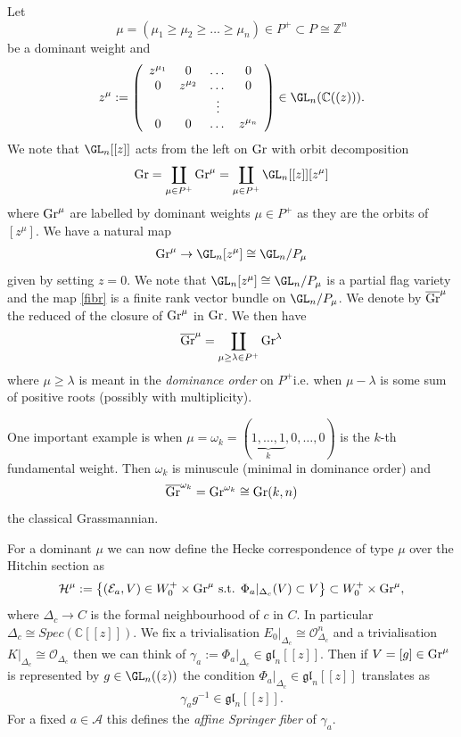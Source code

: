 \documentclass[12pt]{article}
\numberwithin{equation}{section}
\theoremstyle{remark}
\numberwithin{theorem}{section}
\def\beq{\begin{eqnarray}}
\def\eeq{\end{eqnarray}}
\def\calE{{\mathcal E}}
\def\C{\mathbb{C}}
\def\calA{{\mathcal{A}}}
\def\calH{\mathcal{H}}
\def\calO{{\mathcal O}}
\def\Z{\mathbb{Z}}
\def\gl{{\mathfrak g\mathfrak l}}
\newcommand{\Gr}{\textnormal{Gr}}
\newcommand{\oGr}{\overline{\textnormal{Gr}}}
\numberwithin{equation}{section}
\begin{document}
Let $$\mu=(\mu_1\geq \mu_2\geq\dots \geq \mu_n)\in P^+\subset P\cong\Z^n$$ be a dominant weight and $$z^\mu:=\left(\begin{array}{cccc}z^{\mu_1} &0&\dots&0 \\ 0&z^{\mu_2}&\dots & 0\\ &&\vdots & \\ 0&0&\dots & z^{\mu_n}\end{array}\right)\in \GL_n(\C((z))).$$ We note that $\GL_n[[z]]$ acts from the left on $\Gr$ with orbit decomposition $$\Gr=\coprod_{\mu\in P^+} \Gr^\mu=\coprod_{\mu\in P^+} \GL_n[[z]] [z^\mu] $$ where $\Gr^\mu$ are labelled by dominant weights $\mu\in P^+$ as they are the orbits of $[z^\mu]$. We have a natural map \beq \label{fibr} \Gr^\mu\to \GL_n [z^\mu] \cong \GL_n/P_\mu \eeq given by setting $z=0$. We note that $\GL_n [z^\mu]\cong \GL_n/P_{\mu}$ is a partial flag variety and the map \eqref{fibr} is a finite rank vector bundle on $ \GL_n/P_{\mu}$. 
We denote by $\oGr^\mu$ the reduced of the closure of $\Gr^\mu$ in $\Gr$. We then have \beq\label{partition}\oGr^\mu=\coprod_{\mu \geq \lambda\in P^+}\Gr^\lambda\eeq where $\mu \geq \lambda$ is meant in the {\em dominance order}  on $P^+$i.e. when $\mu-\lambda$ is some sum of positive roots  (possibly with multiplicity). 

One important example is when $\mu=\omega_k=(\underbrace{1,\dots,1}_k,0,\dots,0)$ is the $k$-th fundamental weight. Then $\omega_k$ is minuscule (minimal in dominance order) and  $$\oGr^{\omega_k}=\Gr^{\omega_k}\cong \Gr(k,n)$$ the classical Grassmannian. 

For a dominant $\mu$ we can now define the Hecke correspondence of type $\mu$ over the Hitchin section as
\beq  \label{general}\calH^\mu:=\left\{ (\calE_a,V)\in W^+_0\times \Gr^\mu  \mbox{ s.t. }  \Phi_a|_{\Delta_c}(V)\subset V\right\}\subset W^+_0\times  \Gr^\mu,\eeq where $\Delta_c\to C$ is the formal neighbourhood of $c$ in $C$. In particular $\Delta_c\cong Spec(\C[[z]])$. We fix a trivialisation $E_0|_{\Delta_c}\cong \calO^n_{\Delta_c}$ and a trivialisation $K|_{\Delta_c}\cong \calO_{\Delta_c}$ then we can think of $\gamma_a:=\Phi_a|_{\Delta_c}\in \gl_n[[z]]$. Then if $V=[g]\in \Gr^\mu$ is represented by $g\in \GL_n((z))$  the condition $\Phi_a|_{\Delta_c}\in \gl_n[[z]]$ translates as \beq \label{affspring} \gamma_a g^{-1}\in \gl_n[[z]].\eeq For a fixed $a\in \calA$ this defines the {\em affine Springer fiber} of $\gamma_a$. 
\end{document}
